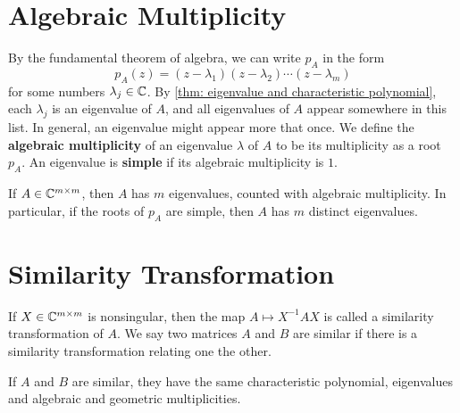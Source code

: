 \section{Algebraic Multiplicity} 
By the fundamental theorem of algebra, we can write $p_A$ in the form 
\begin{equation}
\label{eq: decomp of cha polynomial}
    p_A(z) = (z-\lambda _1) (z-\lambda _2) \cdots (z-\lambda _m)
\end{equation}
for some numbers $\lambda _j\in \mathbb{C}$. By \autoref{thm: eigenvalue and characteristic polynomial}, each $\lambda _j$ is an eigenvalue of $A$, and all eigenvalues of $A$ appear somewhere in this list. In general, an eigenvalue might appear more that once. We define the \textbf{algebraic multiplicity} of an eigenvalue $ \lambda  $ of $ A $ to be its multiplicity as a root $p_A$. An eigenvalue is \textbf{simple} if its algebraic multiplicity is $1$. 


\begin{theorem}
\label{thm: eigenvalues algebra multiplicity}
If $ A\in \mathbb{C}^{ m\times m }  $, then $A$ has $ m $ eigenvalues, counted with algebraic multiplicity. In particular, if the roots of $p_A$ are simple, then $A$ has $ m $ distinct eigenvalues.      
\end{theorem}

\section{Similarity Transformation} 

\begin{definition}
\label{def: Similarity transformation}
If $X\in \mathbb{C}^{m\times m}$ is nonsingular, then the map $A\mapsto X^{-1} A X$ is called a similarity transformation of $A$. We say two matrices $ A $ and $ B $ are similar if there is a similarity transformation relating one the other.  
\end{definition}


\begin{theorem}
\label{thm: Similarity and cha poly}
If $A$ and $B$ are similar, they have the same characteristic polynomial, eigenvalues and algebraic and geometric multiplicities. 
\end{theorem}


